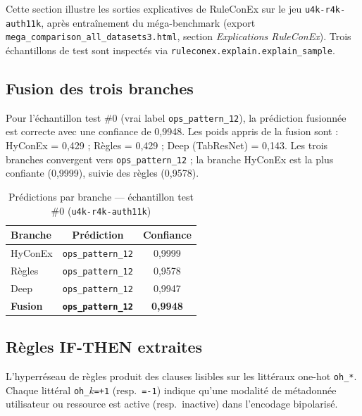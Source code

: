 \documentclass[11pt,a4paper]{article}
\begin{document}
Cette section illustre les sorties explicatives de RuleConEx sur le jeu \texttt{u4k-r4k-auth11k}, après entraînement du méga-benchmark (export \texttt{mega\_comparison\_all\_datasets3.html}, section \emph{Explications RuleConEx}). Trois échantillons de test sont inspectés via \texttt{ruleconex.explain.explain\_sample}.

\subsection{Fusion des trois branches}

Pour l'échantillon test \#0 (vrai label \texttt{ops\_pattern\_12}), la prédiction fusionnée est correcte avec une confiance de 0,9948. Les poids appris de la fusion sont :
HyConEx = 0,429 ; Règles = 0,429 ; Deep (TabResNet) = 0,143.
Les trois branches convergent vers \texttt{ops\_pattern\_12} ; la branche HyConEx est la plus confiante (0,9999), suivie des règles (0,9578).

\begin{table}[h]
\centering
\caption{Prédictions par branche — échantillon test \#0 (\texttt{u4k-r4k-auth11k})}
\small
\begin{tabular}{@{}lcc@{}}
\toprule
\textbf{Branche} & \textbf{Prédiction} & \textbf{Confiance} \\
\midrule
HyConEx & \texttt{ops\_pattern\_12} & 0,9999 \\
Règles & \texttt{ops\_pattern\_12} & 0,9578 \\
Deep & \texttt{ops\_pattern\_12} & 0,9947 \\
\textbf{Fusion} & \textbf{\texttt{ops\_pattern\_12}} & \textbf{0,9948} \\
\bottomrule
\end{tabular}
\end{table}

\subsection{Règles IF-THEN extraites}

L'hyperréseau de règles produit des clauses lisibles sur les littéraux one-hot \texttt{oh\_*}. Chaque littéral \texttt{oh\_$k$=+1} (resp.\ \texttt{=-1}) indique qu'une modalité de métadonnée utilisateur ou ressource est active (resp.\ inactive) dans l'encodage bipolarisé.
\end{document}
